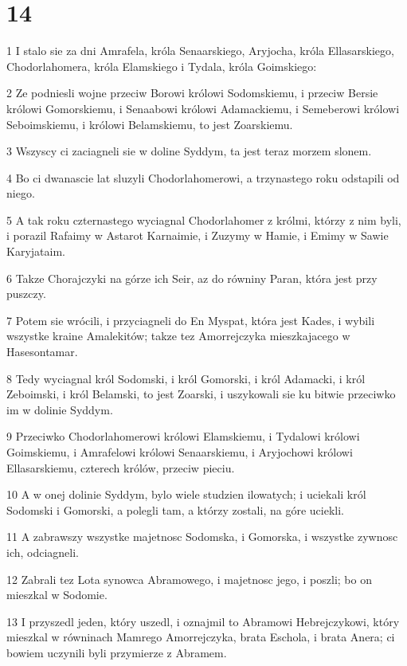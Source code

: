 \chapter{14}

\par 1 I stalo sie za dni Amrafela, króla Senaarskiego, Aryjocha, króla Ellasarskiego, Chodorlahomera, króla Elamskiego i Tydala, króla Goimskiego:
\par 2 Ze podniesli wojne przeciw Borowi królowi Sodomskiemu, i przeciw Bersie królowi Gomorskiemu, i Senaabowi królowi Adamackiemu, i Semeberowi królowi Seboimskiemu, i królowi Belamskiemu, to jest Zoarskiemu.
\par 3 Wszyscy ci zaciagneli sie w doline Syddym, ta jest teraz morzem slonem.
\par 4 Bo ci dwanascie lat sluzyli Chodorlahomerowi, a trzynastego roku odstapili od niego.
\par 5 A tak roku czternastego wyciagnal Chodorlahomer z królmi, którzy z nim byli, i porazil Rafaimy w Astarot Karnaimie, i Zuzymy w Hamie, i Emimy w Sawie Karyjataim.
\par 6 Takze Chorajczyki na górze ich Seir, az do równiny Paran, która jest przy puszczy.
\par 7 Potem sie wrócili, i przyciagneli do En Myspat, która jest Kades, i wybili wszystke kraine Amalekitów; takze tez Amorrejczyka mieszkajacego w Hasesontamar.
\par 8 Tedy wyciagnal król Sodomski, i król Gomorski, i król Adamacki, i król Zeboimski, i król Belamski, to jest Zoarski, i uszykowali sie ku bitwie przeciwko im w dolinie Syddym.
\par 9 Przeciwko Chodorlahomerowi królowi Elamskiemu, i Tydalowi królowi Goimskiemu, i Amrafelowi królowi Senaarskiemu, i Aryjochowi królowi Ellasarskiemu, czterech królów, przeciw pieciu.
\par 10 A w onej dolinie Syddym, bylo wiele studzien ilowatych; i uciekali król Sodomski i Gomorski, a polegli tam, a którzy zostali, na góre uciekli.
\par 11 A zabrawszy wszystke majetnosc Sodomska, i Gomorska, i wszystke zywnosc ich, odciagneli.
\par 12 Zabrali tez Lota synowca Abramowego, i majetnosc jego, i poszli; bo on mieszkal w Sodomie.
\par 13 I przyszedl jeden, który uszedl, i oznajmil to Abramowi Hebrejczykowi, który mieszkal w równinach Mamrego Amorrejczyka, brata Eschola, i brata Anera; ci bowiem uczynili byli przymierze z Abramem.
